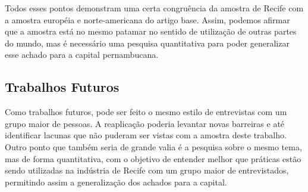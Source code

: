 Todos esses pontos demonstram uma certa congruência da amostra de Recife com a amostra européia e norte-americana do artigo base. Assim, podemos afirmar que a amostra está no mesmo patamar no sentido de utilização de outras partes do mundo, mas é necessário uma pesquisa quantitativa para poder generalizar esse achado para a capital pernambucana. 

\subsection{Trabalhos Futuros}

Como trabalhos futuros, pode ser feito o mesmo estilo de entrevistas com um grupo maior de pessoas. A reaplicação poderia levantar novas barreiras e até identificar lacunas que não puderam ser vistas com a amostra deste trabalho. Outro ponto que também seria de grande valia é a pesquisa sobre o mesmo tema, mas de forma quantitativa, com o objetivo de entender melhor que práticas estão sendo utilizadas na indústria de Recife com um grupo maior de entrevistados, permitindo assim a generalização dos achados para a capital. 
